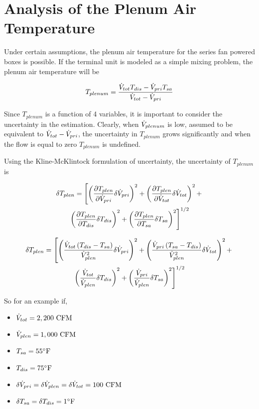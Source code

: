 \section{Analysis of the Plenum Air Temperature}

Under certain assumptions, the plenum air temperature for the series fan powered boxes is possible. If the terminal unit is modeled as a simple mixing problem, the plenum air temperature will be 

\begin{equation}
    T_{plenum}=\frac{\dot{V}_{tot}T_{dis}-\dot{V}_{pri}T_{sa}}{\dot{V}_{tot} -\dot{V}_{pri}}
\end{equation}

Since \(T_{plenum}\) is a function of 4 variables, it is important to consider the uncertainty in the estimation. Clearly, when \(\dot{V}_{plenum}\) is low, assumed to be equivalent to \(\dot{V}_{tot} - \dot{V}_{pri}\), the uncertainty in  \(T_{plenum}\) grows significantly and when the flow is equal to zero \(T_{plenum}\) is undefined. 

Using the Kline-McKlintock formulation of uncertainty, the uncertainty of \(T_{plenum}\) is 

\begin{multline}
    \delta T_{plen} = \left[\left( \pdv{T_{plen}}{\dot{V}_{pri}} \delta \dot{V}_{pri}   \right)^2  +\left( \pdv{T_{plen}}{\dot{V}_{tot}} \delta \dot{V}_{tot}   \right)^2 + \right. \\
    \left. \left( \pdv{T_{plen}}{T_{dis}} \delta T_{dis}   \right)^2 + \left( \pdv{T_{plen}}{T_{sa}} \delta T_{sa}   \right)^2  \right]^{1/2}
\end{multline}

\begin{multline}
    \delta T_{plen} = \left[\left(  \frac{\dot{V}_{tot}\left(T_{dis}-T_{sa} \right)}{{\dot{V}_{plen}}^2}   \delta \dot{V}_{pri} \right)^2  +\left(\frac{\dot{V}_{pri}\left(T_{sa}-T_{dis} \right)}{{\dot{V}_{plen}}^2}      \delta \dot{V}_{tot}   \right)^2 + \right. \\
    \left. \left( \frac{\dot{V}_{tot}}{\dot{V}_{plen}} \delta T_{dis}   \right)^2 + \left(\frac{\dot{V}_{pri}}{\dot{V}_{plen}}  \delta T_{sa}   \right)^2  \right]^{1/2}
\end{multline}

So for an example if, 

\begin{itemize}
    \item \(\dot{V}_{tot}{}=2,200\text{ CFM}\)
    \item \(\dot{V}_{plen}{}=1,000\text{ CFM}\)
    \item \(T_{sa} = 55^{\circ}\text{F} \)
    \item \(T_{dis} = 75^{\circ}\text{F} \)
    \item \(\delta\dot{V}_{pri}{}=\delta\dot{V}_{plen}=\delta\dot{V}_{tot}=100 \text{ CFM}\)
    \item \(\delta T_{sa} = \delta T_{dis} = 1^{\circ} \text{F} \)
\end{itemize}


